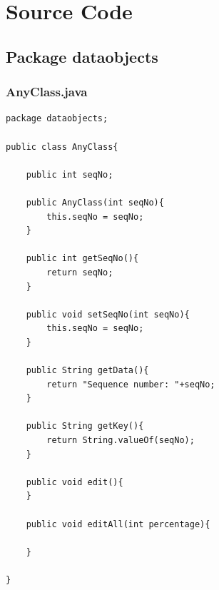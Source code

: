 \documentclass[12pt]{article}
\begin{document}
\section{Source Code}
\bigskip

\footnotesize
\subsection{Package dataobjects}
\subsubsection{AnyClass.java}
\begin{lstlisting}
package dataobjects;

public class AnyClass{

    public int seqNo;

    public AnyClass(int seqNo){
        this.seqNo = seqNo;
    }

    public int getSeqNo(){
        return seqNo;
    }

    public void setSeqNo(int seqNo){
        this.seqNo = seqNo;
    }

    public String getData(){
        return "Sequence number: "+seqNo;
    }

    public String getKey(){
        return String.valueOf(seqNo);
    }

    public void edit(){
    }

    public void editAll(int percentage){

    }

}
\end{lstlisting}
\end{document}
